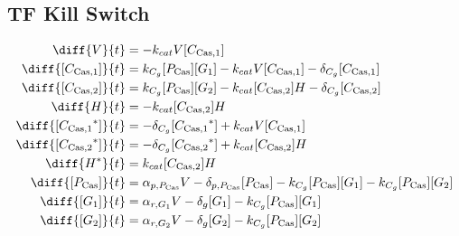 \subsection{TF Kill Switch}
\label{s:TF_delayed_kill_switch}

\begin{align}
\diff{\vectorGen{}}{t} & = - \casCutRate{{}}\vectorGen{}\conc{\cplx{\cas}{1}}\\ 
\diff{\conc{\cplx{\cas}{1}}}{t} & =  \gRnaBind{}\conc{\proSp{\cas{}}}\conc{\gRna{1}} - \casCutRate{{}}\vectorGen{}\conc{\cplx{\cas}{1}} - \casCompDegradeRate{}\conc{\cplx{\cas}{1}}\\ 
\diff{\conc{\cplx{\cas}{2}}}{t} & =  \gRnaBind{}\conc{\proSp{\cas{}}}\conc{\gRna{2}} - \casCutRate{{}}\conc{\cplx{\cas}{2}}\hostGen{} - \casCompDegradeRate{}\conc{\cplx{\cas}{2}}\\ 
\diff{\hostGen{}}{t} & = - \casCutRate{{}}\conc{\cplx{\cas}{2}}\hostGen{}\\ 
\diff{\conc{\bound{\cplx{\cas}{1}}}}{t} & = - \casCompDegradeRate{}\conc{\bound{\cplx{\cas}{1}}} + \casCutRate{{}}\vectorGen{}\conc{\cplx{\cas}{1}}\\ 
\diff{\conc{\bound{\cplx{\cas}{2}}}}{t} & = - \casCompDegradeRate{}\conc{\bound{\cplx{\cas}{2}}} + \casCutRate{{}}\conc{\cplx{\cas}{2}}\hostGen{}\\ 
\diff{\edited{\hostGen{}}}{t} & =  \casCutRate{{}}\conc{\cplx{\cas}{2}}\hostGen{}\\ 
\diff{\conc{\proSp{\cas{}}}}{t} & =  \txtlRate{\proSp{\cas{}}}\vectorGen{} - \proDegradeRate{\proSp{\cas{}}}\conc{\proSp{\cas{}}} - \gRnaBind{}\conc{\proSp{\cas{}}}\conc{\gRna{1}} - \gRnaBind{}\conc{\proSp{\cas{}}}\conc{\gRna{2}}\\ 
\diff{\conc{\gRna{1}}}{t} & =  \txRate{\gRna{1}}\vectorGen{} - \rnaDegradeRate{}\conc{\gRna{1}} - \gRnaBind{}\conc{\proSp{\cas{}}}\conc{\gRna{1}}\\ 
\diff{\conc{\gRna{2}}}{t} & =  \txRate{\gRna{2}}\vectorGen{} - \rnaDegradeRate{}\conc{\gRna{2}} - \gRnaBind{}\conc{\proSp{\cas{}}}\conc{\gRna{2}}
\end{align}

